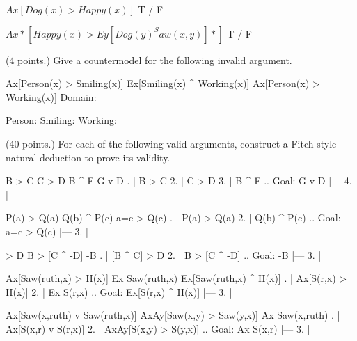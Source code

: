 $ Ax[Dog(x) > Happy(x)] $
	\answer
	 T / F
	\endanswer

$ Ax*[Happy(x) > Ey[Dog(y) ^ Saw(x,y)]*] $
	\answer
	 T / F
	\endanswer
\endproblems

(4 points.) Give a countermodel for the following invalid argument.

\problems
{}
\argument
 Ax[Person(x) > Smiling(x)]
 Ex[Smiling(x) ^ Working(x)]
\argumentline
 Ax[Person(x) > Working(x)]
\endargument
	\answer
	\firstordermodel
	Domain:  

	Person:  
	Smiling: 
	Working: 
	\endfirstordermodel
	\endanswer
\endproblems 

(40 points.) For each of the following valid arguments, construct a Fitch-style natural deduction to prove its validity.

\problems
{}
\argument
 B > C
 C > D
 B ^ F
\argumentline
 G v D
\endargument
{}
	\answer
	. | B > C
	 2. | C > D
	 3. | B ^ F  ..  Goal: G v D
	    |---
	 4. | 
	\endfitchproof
	\endanswer

\argument
 P(a) > Q(a)
 Q(b) ^ P(c)
\argumentline
 a=c > Q(c)
\endargument
{}
	\answer
	. | P(a) > Q(a)
	 2. | Q(b) ^ P(c)  ..  Goal: a=c > Q(c)
	    |---
	 3. | 
	\endfitchproof
	\endanswer

\argument
 [B ^ C] > D
 B > [C ^ -D]
\argumentline
 -B
\endargument
{}
	\answer
	. | [B ^ C] > D
	 2. | B > [C ^ -D]  ..  Goal: -B
	    |---
	 3. | 
	\endfitchproof
	\endanswer

\argument
 Ax[Saw(ruth,x) > H(x)]
 Ex Saw(ruth,x)
\argumentline
 Ex[Saw(ruth,x) ^ H(x)]
\endargument
{}
	\answer
	. | Ax[S(r,x) > H(x)]
	 2. | Ex S(r,x)              ..  Goal: Ex[S(r,x) ^ H(x)]
	    |---
	 3. | 
	\endfitchproof
	\endanswer

\argument
 Ax[Saw(x,ruth) v Saw(ruth,x)]
 AxAy[Saw(x,y) > Saw(y,x)]
\argumentline
 Ax Saw(x,ruth)
\endargument
{}
	\answer
	. | Ax[S(x,r) v S(r,x)]
	 2. | AxAy[S(x,y) > S(y,x)]        ..  Goal: Ax S(x,r)
	    |---
	 3. | 
	\endfitchproof
	\endanswer

\endproblems
\bye
